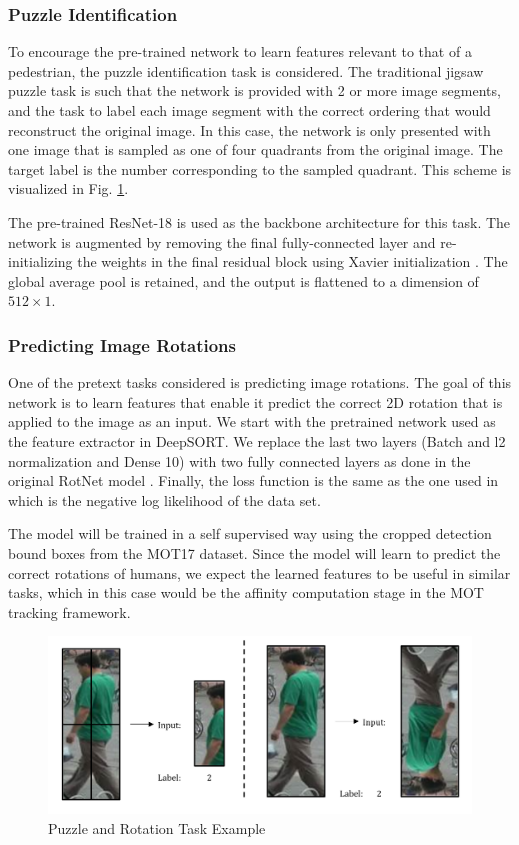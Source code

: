 \documentclass[10pt,twocolumn,letterpaper]{article}
\begin{document}
\subsubsection{Puzzle Identification}
To encourage the pre-trained network to learn features relevant to that of a pedestrian, the puzzle identification task is considered. The traditional jigsaw puzzle task is such that the network is provided with 2 or more image segments, and the task to label each image segment with the correct ordering that would reconstruct the original image. In this case, the network is only presented with one image that is sampled as one of four quadrants from the original image. The target label is the number corresponding to the sampled quadrant. This scheme is visualized in Fig. \ref{fig:puzzle}.

The pre-trained ResNet-18 is used as the backbone architecture for this task. The network is augmented by removing the final fully-connected layer and re-initializing the weights in the final residual block using Xavier initialization \cite{XavierInit}. The global average pool is retained, and the output is flattened to a dimension of $512\times1$.

\subsubsection{Predicting Image Rotations}
One of the pretext tasks considered is predicting image rotations. The goal of this network is to learn features that enable it predict the correct 2D rotation that is applied to the image as an input. We start with the pretrained network used as the feature extractor in DeepSORT. We replace the last two layers (Batch and l2 normalization and Dense 10) with two fully connected layers as done in the original RotNet model \cite{Johnson20}. Finally, the loss function is the same as the one used in \cite{gidaris2018unsupervised} which is the negative log likelihood of the data set.


The model will be trained in a self supervised way using the cropped detection bound boxes from the MOT17 dataset. Since the model will learn to predict the correct rotations of humans, we expect the learned features to be useful in similar tasks, which in this case would be the affinity computation stage in the MOT tracking framework. 

\begin{figure}[h!]
    \centering
    \includegraphics[width=0.95\linewidth]{docs/reports/figs/puzzle_task.png}
    \caption{Puzzle and Rotation Task Example}
    \label{fig:puzzle}
\end{figure}
\end{document}
